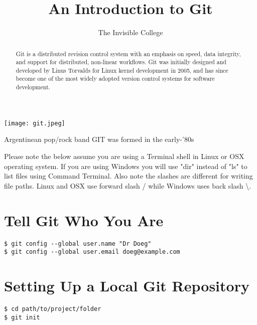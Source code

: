 \documentclass{tufte-handout}
\title{An Introduction to Git}
\author[Dr. Doeg]{The Invisible College}
\begin{document}
\maketitle%
\begin{marginfigure}%
  \texttt{[image: git.jpeg]}
  \caption{Argentinean pop/rock band GIT was formed in the early-'80s}
  \label{fig:marginfig}
\end{marginfigure}
\begin{abstract}
\noindent
Git is a distributed revision control system with an emphasis on speed, data integrity, and support for distributed, non-linear workflows.  Git was initially designed and developed by Linus Torvalds for Linux kernel development in 2005, and has since become one of the most widely adopted version control systems for software development.
\end{abstract}

\noindent \footnotesize{Please note the below assume you are using a Terminal shell in Linux or OSX operating system.  If you are using Windows you will use "dir" instead of "ls" to list files using Command Terminal.  Also note the slashes are different for writing file paths.  Linux and OSX use forward slash / while Windows uses back slash \textbackslash.}

\normalsize
\section{Tell Git Who You Are}

\begin{shaded}
\begin{verbatim}
$ git config --global user.name "Dr Doeg"
$ git config --global user.email doeg@example.com
\end{verbatim}
\end{shaded}

\section{Setting Up a Local Git Repository}


\begin{shaded}
\begin{verbatim}
$ cd path/to/project/folder
$ git init
\end{verbatim}
\end{shaded}
\end{document}
